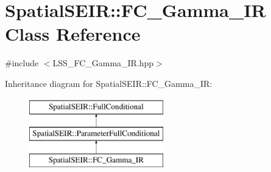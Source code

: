 \hypertarget{classSpatialSEIR_1_1FC__Gamma__IR}{\section{Spatial\-S\-E\-I\-R\-:\-:F\-C\-\_\-\-Gamma\-\_\-\-I\-R Class Reference}
\label{classSpatialSEIR_1_1FC__Gamma__IR}
}


{\ttfamily \#include $<$L\-S\-S\-\_\-\-F\-C\-\_\-\-Gamma\-\_\-\-I\-R.\-hpp$>$}

Inheritance diagram for Spatial\-S\-E\-I\-R\-:\-:F\-C\-\_\-\-Gamma\-\_\-\-I\-R\-:\begin{figure}[H]
\begin{center}
\leavevmode
\includegraphics[height=3.000000cm]{classSpatialSEIR_1_1FC__Gamma__IR}
\end{center}
\end{figure}
